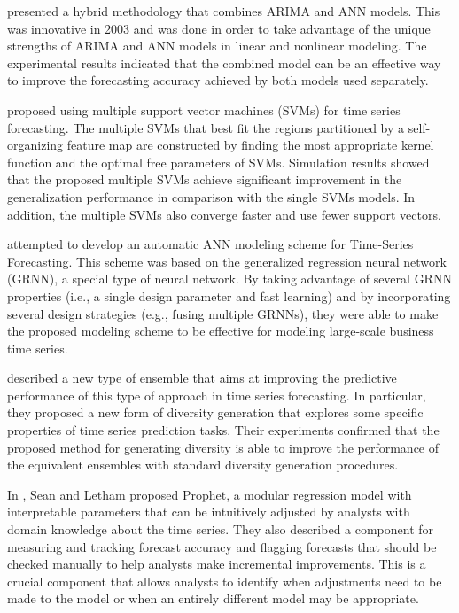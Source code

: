 \cite{ZHANG2003159} presented a hybrid methodology that combines ARIMA and ANN models.
This was innovative in 2003 and was done in order to take advantage of the unique strengths of ARIMA and ANN models in linear and nonlinear modeling.
The experimental results indicated that the combined model can be an effective way to improve the forecasting accuracy achieved by both models used separately.

\cite{CAO2003321} proposed using multiple support vector machines (SVMs) for time series forecasting.
The multiple SVMs that best fit the regions partitioned by a self-organizing feature map are constructed by finding the most appropriate kernel function and the optimal free parameters of SVMs.
Simulation results showed that the proposed multiple SVMs achieve significant improvement in the generalization performance in comparison with the single SVMs models.
In addition, the multiple SVMs also converge faster and use fewer support vectors.

\cite{6210391} attempted to develop an automatic ANN modeling scheme for Time-Series Forecasting.
This scheme was based on the generalized regression neural network (GRNN), a special type of neural network.
By taking advantage of several GRNN properties (i.e., a single design parameter and fast learning) and by incorporating several design strategies (e.g., fusing multiple GRNNs), they were able to make the proposed modeling scheme to be effective for modeling large-scale business time series.

\cite{Oliveira2015} described a new type of ensemble that aims at improving the predictive performance of this type of approach in time series forecasting.
In particular, they proposed a new form of diversity generation that explores some specific properties of time series prediction tasks.
Their experiments confirmed that the proposed method for generating diversity is able to improve the performance of the equivalent ensembles with standard diversity generation procedures.

In \cite{Sean2017}, Sean and Letham proposed Prophet, a modular regression model with interpretable parameters that can be intuitively adjusted by analysts with domain knowledge about the time series.
They also described a component for measuring and tracking forecast accuracy and flagging forecasts that should be checked manually to help analysts make incremental improvements.
This is a crucial component that allows analysts to identify when adjustments need to be made to the model or when an entirely different model may be appropriate.

